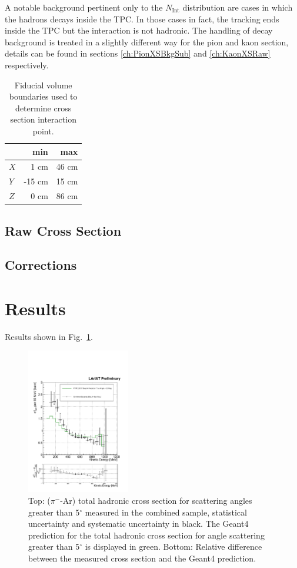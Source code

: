 \documentclass[aps,prl,twocolumn,showpacs,superscriptaddress,groupedaddress]{revtex4}  %
\begin{document}
 A notable background pertinent only to the $N_{\text{Int}}$  distribution are cases in which the hadrons decays inside the TPC. In those cases in fact, the tracking ends inside the TPC but the interaction is not hadronic. The handling of decay background is treated in a slightly different way for the pion and kaon section, details can be found in sections \ref{ch:PionXSBkgSub} and \ref{ch:KaonXSRaw} respectively.



\begin{table}[t]
\centering
\begin{tabular}{|l|r|r|}
\hline
& min   &  max  \\ \hline
$X$ & 1 cm   & 46 cm  \\ \hline
$Y$ & -15 cm   & 15  cm  \\ \hline
$Z$ & 0 cm   & 86 cm  \\ \hline
\end{tabular}
\caption{Fiducial volume boundaries used to determine cross section interaction point. }
\label{tab:FidVol}
\end{table}


\subsection{\label{sec:RawXS}Raw Cross Section}
\subsection{\label{sec:Corrections}Corrections}

\section{\label{sec:Results}Results}
Results shown in Fig.~\ref{fig:epsart}.

\begin{figure}
\includegraphics[width =0.4\textwidth ]{TheRealMoneyPlot}
\caption{\label{fig:epsart} Top: ($\pi^-$-Ar) total hadronic cross section for  scattering angles greater than 5$^\circ$ measured in the combined sample, statistical uncertainty and systematic uncertainty in black. The Geant4 prediction for the total hadronic cross section for angle scattering greater than 5$^\circ$ is displayed in green. Bottom: Relative difference between the measured cross section and the Geant4 prediction. }
\end{figure}
\end{document}
